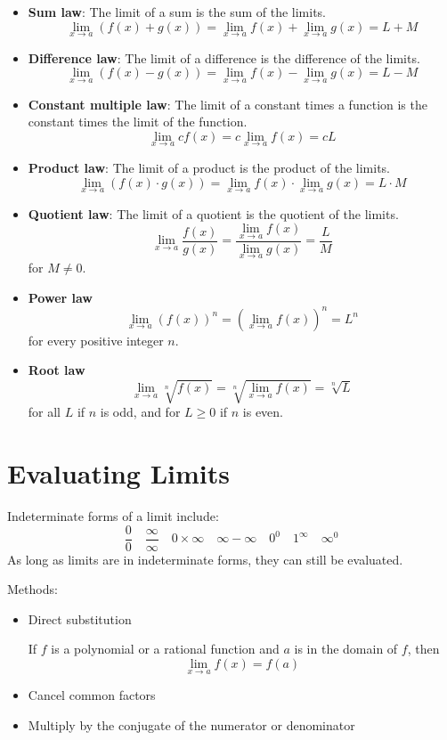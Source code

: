 \begin{itemize}
\item \textbf{Sum law}: The limit of a sum is the sum of the limits.
\[ \lim_{x\to a}(f(x)+g(x)) = \lim_{x\to a}f(x) + \lim_{x\to a}g(x) = L+M \]

\item \textbf{Difference law}: The limit of a difference is the difference of the limits.
\[ \lim_{x\to a}(f(x)-g(x)) = \lim_{x\to a}f(x) - \lim_{x\to a}g(x) = L-M \]

\item \textbf{Constant multiple law}: The limit of a constant times a function is the constant times the limit of the function.
\[ \lim_{x\to a}cf(x) = c\lim_{x\to a}f(x) = cL \]

\item \textbf{Product law}: The limit of a product is the product of the limits.
\[ \lim_{x\to a}(f(x)\cdot g(x)) = \lim_{x\to a}f(x) \cdot \lim_{x\to a}g(x) = L\cdot M \]

\item \textbf{Quotient law}: The limit of a quotient is the quotient of the limits.
\[ \lim_{x\to a}\frac{f(x)}{g(x)} = \frac{\lim_{x\to a}f(x)}{\lim_{x\to a}g(x)} = \frac{L}{M} \]
for $M \neq 0$.

\item \textbf{Power law}
\[ \lim_{x\to a}(f(x))^n = (\lim_{x\to a}f(x))^n = L^n \]
for every positive integer $n$.

\item \textbf{Root law}
\[ \lim_{x\to a}\sqrt[n]{f(x)} = \sqrt[n]{\lim_{x\to a}f(x)} = \sqrt[n]{L} \]
for all $L$ if $n$ is odd, and for $L\ge 0$ if $n$ is even.
\end{itemize}
\pagebreak

\section{Evaluating Limits}
Indeterminate forms of a limit include:
\[ \frac{0}{0} \quad \frac{\infty}{\infty} \quad 0 \times \infty \quad \infty - \infty \quad 0^0 \quad 1^{\infty} \quad \infty^0 \]
As long as limits are in indeterminate forms, they can still be evaluated.

Methods:
\begin{itemize}
\item Direct substitution

If $f$ is a polynomial or a rational function and $a$ is in the domain of $f$, then
\[ \lim_{x\to a}f(x)=f(a) \]

\item Cancel common factors
\item Multiply by the conjugate of the numerator or denominator
\end{itemize}

